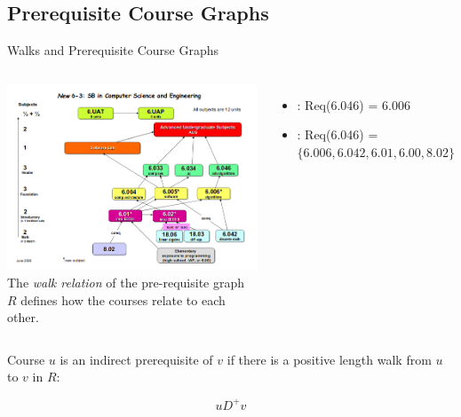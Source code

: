 \subsection{Prerequisite Course Graphs}

\begin{frame}{Walks and Prerequisite Course Graphs}
  \begin{columns}
      \includegraphics[width=1\textwidth]{../img/MIT_prereq}
      The \emph{walk relation} of the pre-requisite graph $R$ defines how the courses relate to each other.
      \begin{itemize}
      \item {}: Req(6.046) = 6.006
      \item {}: Req(6.046) = $\{6.006, 6.042, 6.01, 6.00, 8.02\}$
      \end{itemize}\medskip
  \end{columns}\bigskip

  Course $u$ is an indirect prerequisite of $v$ if there is a positive length walk from $u$ to $v$ in $R$:\medskip

  \begin{equation*}
    u D^+ v
  \end{equation*}
\end{frame}

